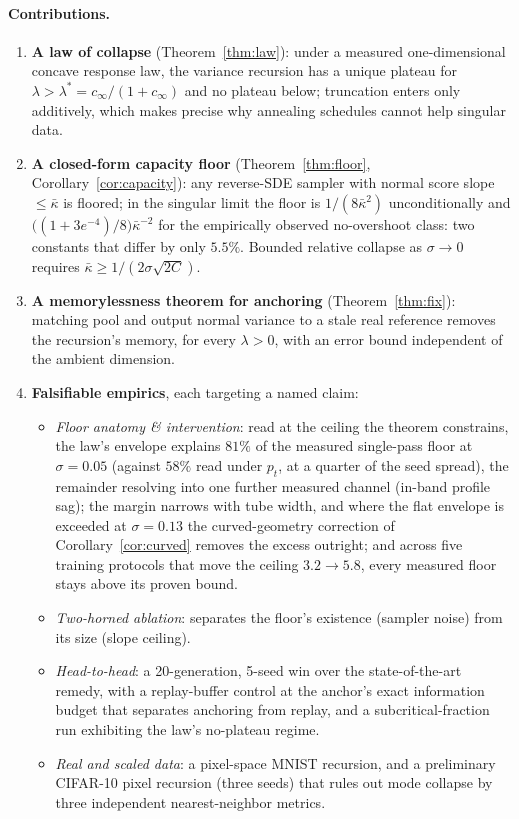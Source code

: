 \documentclass[11pt]{article}
\theoremstyle{remark}
\newcommand{\kb}{\bar\kappa}
\begin{document}
\paragraph{Contributions.}
\begin{enumerate}\itemsep2pt
\item \textbf{A law of collapse} (Theorem~\ref{thm:law}): under a measured
  one-dimensional concave response law, the variance recursion has a unique plateau for
  $\lambda>\lambda^*=c_\infty/(1+c_\infty)$ and no plateau below; truncation enters only
  additively, which makes precise why annealing schedules cannot help singular data.
\item \textbf{A closed-form capacity floor} (Theorem~\ref{thm:floor},
  Corollary~\ref{cor:capacity}): any reverse-SDE sampler with normal score slope
  $\le\kb$ is floored; in the singular limit the floor is $1/(8\kb^2)$ unconditionally
  and $\big((1+3e^{-4})/8\big)\kb^{-2}$ for the empirically observed no-overshoot class:
  two constants that differ by only $5.5\%$. Bounded relative collapse as $\sigma\to0$
  requires $\kb\ge 1/(2\sigma\sqrt{2C})$.
\item \textbf{A memorylessness theorem for anchoring} (Theorem~\ref{thm:fix}): matching
  pool and output normal variance to a stale real reference removes the recursion's
  memory, for every $\lambda>0$, with an error bound independent of the ambient dimension.
\item \textbf{Falsifiable empirics}, each targeting a named claim:
  \begin{itemize}\itemsep1pt
  \item \emph{Floor anatomy \& intervention}: read at the ceiling the theorem
    constrains, the law's envelope explains $81\%$ of the measured single-pass floor at
    $\sigma=0.05$ (against $58\%$ read under $p_t$, at a quarter of the seed spread), the
    remainder resolving into
    one further measured channel (in-band profile sag); the margin narrows with tube width,
    and where the flat envelope is exceeded at $\sigma=0.13$ the curved-geometry correction
    of Corollary~\ref{cor:curved} removes the excess outright;
    and across five training protocols that move the ceiling $3.2\to5.8$, every measured
    floor stays above its proven bound.
  \item \emph{Two-horned ablation}: separates the floor's existence (sampler noise) from
    its size (slope ceiling).
  \item \emph{Head-to-head}: a 20-generation, 5-seed win over the state-of-the-art remedy,
    with a replay-buffer control at the anchor's exact information budget that separates
    anchoring from replay, and a subcritical-fraction run exhibiting the law's no-plateau
    regime.
  \item \emph{Real and scaled data}: a pixel-space MNIST recursion, and a preliminary
    CIFAR-10 pixel recursion (three seeds) that rules out mode collapse by three
    independent nearest-neighbor metrics.
  \end{itemize}
\end{enumerate}
\end{document}

